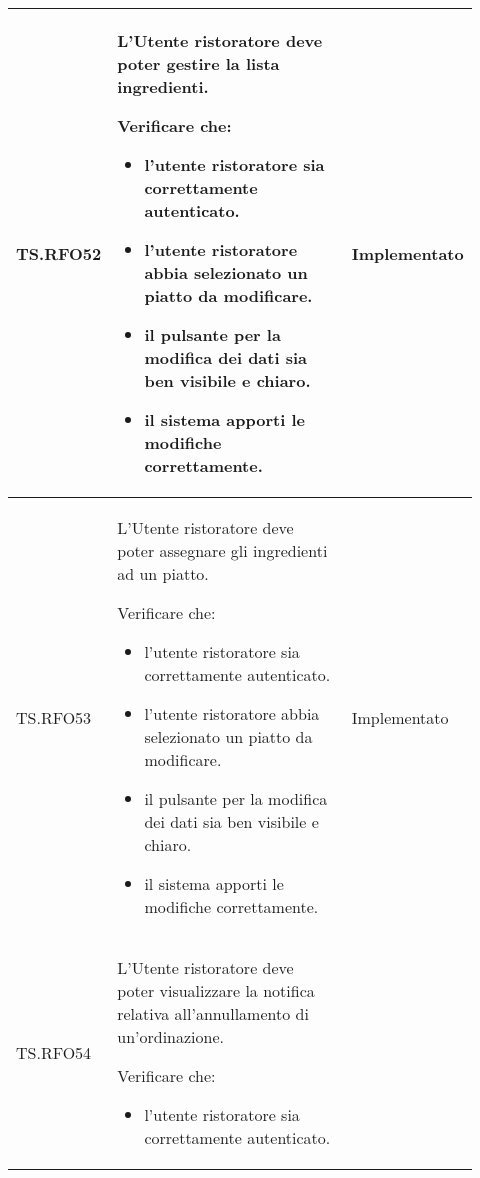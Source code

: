 \begin{longtable}{|p{0.10\linewidth}|p{0.70\linewidth}|p{0.12\linewidth}|}
	\hline
	TS.RFO52                                                                                                                        &
	L'Utente ristoratore deve poter gestire la lista ingredienti. \par
	Verificare che:
	\begin{itemize}
		\item l'utente ristoratore sia correttamente autenticato.
		\item l'utente ristoratore abbia selezionato un piatto da modificare.
		\item il pulsante per la modifica dei dati sia ben visibile e chiaro.
		\item il sistema apporti le modifiche correttamente.
	\end{itemize}                                                           &
	Implementato                                                                                                                                                            \\
	\hline
	TS.RFO53                                                                                                                        &
	L'Utente ristoratore deve poter assegnare gli ingredienti ad un piatto. \par
	Verificare che:
	\begin{itemize}
		\item l'utente ristoratore sia correttamente autenticato.
		\item l'utente ristoratore abbia selezionato un piatto da modificare.
		\item il pulsante per la modifica dei dati sia ben visibile e chiaro.
		\item il sistema apporti le modifiche correttamente.
	\end{itemize}                                                           &
	Implementato                                                                                                                                                            \\
	\hline
	TS.RFO54                                                                                                                        &
	L'Utente ristoratore deve poter visualizzare la notifica relativa all'annullamento di un'ordinazione. \par
	Verificare che:
	\begin{itemize}
		\item l'utente ristoratore sia correttamente autenticato.

\end{itemize}
\end{longtable}
